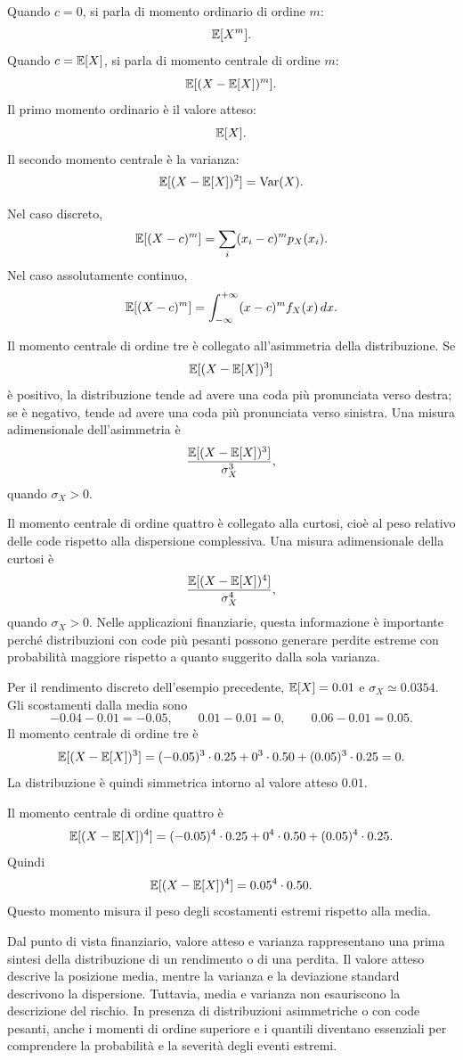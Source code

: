 Quando $c=0$, si parla di momento ordinario di ordine $m$:
\[
\mathbb{E}[X^m].
\]
Quando $c=\mathbb{E}[X]$, si parla di momento centrale di ordine $m$:
\[
\mathbb{E}[(X-\mathbb{E}[X])^m].
\]
Il primo momento ordinario \`{e} il valore atteso:
\[
\mathbb{E}[X].
\]
Il secondo momento centrale \`{e} la varianza:
\[
\mathbb{E}[(X-\mathbb{E}[X])^2]=\operatorname{Var}(X).
\]

Nel caso discreto,
\[
\mathbb{E}[(X-c)^m]
=
\sum_i (x_i-c)^m p_X(x_i).
\]
Nel caso assolutamente continuo,
\[
\mathbb{E}[(X-c)^m]
=
\int_{-\infty}^{+\infty}(x-c)^m f_X(x)\,dx.
\]

Il momento centrale di ordine tre \`{e} collegato all'asimmetria della
distribuzione. Se
\[
\mathbb{E}[(X-\mathbb{E}[X])^3]
\]
\`{e} positivo, la distribuzione tende ad avere una coda pi\`{u} pronunciata verso
destra; se \`{e} negativo, tende ad avere una coda pi\`{u} pronunciata verso
sinistra. Una misura adimensionale dell'asimmetria \`{e}
\[
\frac{\mathbb{E}[(X-\mathbb{E}[X])^3]}{\sigma_X^3},
\]
quando $\sigma_X>0$.

Il momento centrale di ordine quattro \`{e} collegato alla curtosi, cio\`{e} al
peso relativo delle code rispetto alla dispersione complessiva. Una misura
adimensionale della curtosi \`{e}
\[
\frac{\mathbb{E}[(X-\mathbb{E}[X])^4]}{\sigma_X^4},
\]
quando $\sigma_X>0$. Nelle applicazioni finanziarie, questa informazione \`{e}
importante perch\'{e} distribuzioni con code pi\`{u} pesanti possono generare
perdite estreme con probabilit\`{a} maggiore rispetto a quanto suggerito dalla
sola varianza.

\begin{example}
Per il rendimento discreto dell'esempio precedente, $\mathbb{E}[X]=0.01$ e
$\sigma_X\simeq 0.0354$. Gli scostamenti dalla media sono
\[
-0.04-0.01=-0.05,
\qquad
0.01-0.01=0,
\qquad
0.06-0.01=0.05.
\]
Il momento centrale di ordine tre \`{e}
\[
\mathbb{E}[(X-\mathbb{E}[X])^3]
=
(-0.05)^3\cdot 0.25
+
0^3\cdot 0.50
+
(0.05)^3\cdot 0.25
=
0.
\]
La distribuzione \`{e} quindi simmetrica intorno al valore atteso $0.01$.

Il momento centrale di ordine quattro \`{e}
\[
\mathbb{E}[(X-\mathbb{E}[X])^4]
=
(-0.05)^4\cdot 0.25
+
0^4\cdot 0.50
+
(0.05)^4\cdot 0.25.
\]
Quindi
\[
\mathbb{E}[(X-\mathbb{E}[X])^4]
=
0.05^4\cdot 0.50.
\]
Questo momento misura il peso degli scostamenti estremi rispetto alla media.
\end{example}

Dal punto di vista finanziario, valore atteso e varianza rappresentano una prima
sintesi della distribuzione di un rendimento o di una perdita. Il valore atteso
descrive la posizione media, mentre la varianza e la deviazione standard
descrivono la dispersione. Tuttavia, media e varianza non esauriscono la
descrizione del rischio. In presenza di distribuzioni asimmetriche o con code
pesanti, anche i momenti di ordine superiore e i quantili diventano essenziali
per comprendere la probabilit\`{a} e la severit\`{a} degli eventi estremi.


